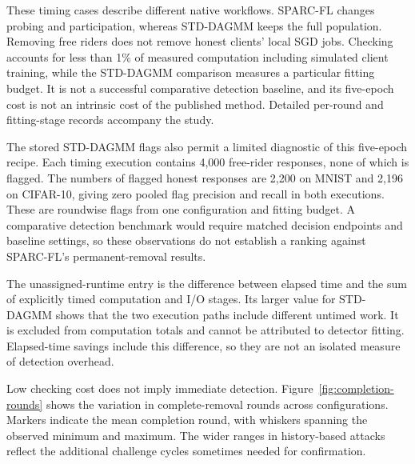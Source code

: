 \documentclass[journal]{IEEEtran}
\begin{document}
These timing cases describe different native workflows. SPARC-FL changes
probing and participation, whereas STD-DAGMM keeps the full population.
Removing free riders does not remove honest clients' local SGD jobs.
Checking accounts for less than 1\% of measured computation including
simulated client training,
while the STD-DAGMM comparison measures a particular fitting budget.
It is not a successful comparative detection baseline, and its five-epoch
cost is not an intrinsic cost of the published method.
Detailed per-round and fitting-stage records accompany the study.

The stored STD-DAGMM flags also permit a limited diagnostic of this
five-epoch recipe. Each timing execution contains 4,000 free-rider
responses, none of which is flagged. The numbers of flagged honest
responses are 2,200 on MNIST and 2,196 on CIFAR-10, giving zero pooled
flag precision and recall in both executions. These are roundwise flags
from one configuration and fitting budget. A comparative detection
benchmark would require matched decision endpoints and baseline settings,
so these observations do not establish a ranking against SPARC-FL's
permanent-removal results.

The unassigned-runtime entry is the difference between elapsed time and
the sum of explicitly timed computation and I/O stages. Its larger value
for STD-DAGMM shows that the two execution paths include different
untimed work. It is excluded from computation totals and cannot be
attributed to detector fitting. Elapsed-time savings include this
difference, so they are not an isolated measure of detection overhead.

Low checking cost does not imply immediate detection.
Figure~\ref{fig:completion-rounds} shows the variation in complete-removal
rounds across configurations. Markers indicate the mean completion round,
with whiskers spanning the observed minimum and maximum.
The wider ranges in history-based attacks
reflect the additional challenge cycles sometimes needed for confirmation.

\end{document}
